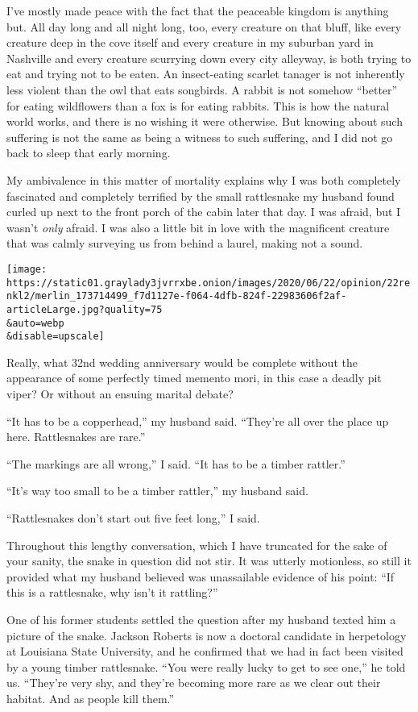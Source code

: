 I've mostly made peace with the fact that the peaceable kingdom is
anything but. All day long and all night long, too, every creature on
that bluff, like every creature deep in the cove itself and every
creature in my suburban yard in Nashville and every creature scurrying
down every city alleyway, is both trying to eat and trying not to be
eaten. An insect-eating scarlet tanager is not inherently less violent
than the owl that eats songbirds. A rabbit is not somehow ``better'' for
eating wildflowers than a fox is for eating rabbits. This is how the
natural world works, and there is no wishing it were otherwise. But
knowing about such suffering is not the same as being a witness to such
suffering, and I did not go back to sleep that early morning.

My ambivalence in this matter of mortality explains why I was both
completely fascinated and completely terrified by the small rattlesnake
my husband found curled up next to the front porch of the cabin later
that day. I was afraid, but I wasn't \emph{only} afraid. I was also a
little bit in love with the magnificent creature that was calmly
surveying us from behind a laurel, making not a sound.

\texttt{[image: https://static01.graylady3jvrrxbe.onion/images/2020/06/22/opinion/22renkl2/merlin\_173714499\_f7d1127e-f064-4dfb-824f-22983606f2af-articleLarge.jpg?quality=75\\\&auto=webp\\\&disable=upscale]}

Really, what 32nd wedding anniversary would be complete without the
appearance of some perfectly timed memento mori, in this case a deadly
pit viper? Or without an ensuing marital debate?

``It has to be a copperhead,'' my husband said. ``They're all over the
place up here. Rattlesnakes are rare.''

``The markings are all wrong,'' I said. ``It has to be a timber
rattler.''

``It's way too small to be a timber rattler,'' my husband said.

``Rattlesnakes don't start out five feet long,'' I said.

Throughout this lengthy conversation, which I have truncated for the
sake of your sanity, the snake in question did not stir. It was utterly
motionless, so still it provided what my husband believed was
unassailable evidence of his point: ``If this is a rattlesnake, why
isn't it rattling?''

One of his former students settled the question after my husband texted
him a picture of the snake. Jackson Roberts is now a doctoral candidate
in herpetology at Louisiana State University, and he confirmed that we
had in fact been visited by a young timber rattlesnake. ``You were
really lucky to get to see one,'' he told us. ``They're very shy, and
they're becoming more rare as we clear out their habitat. And as people
kill them.''

